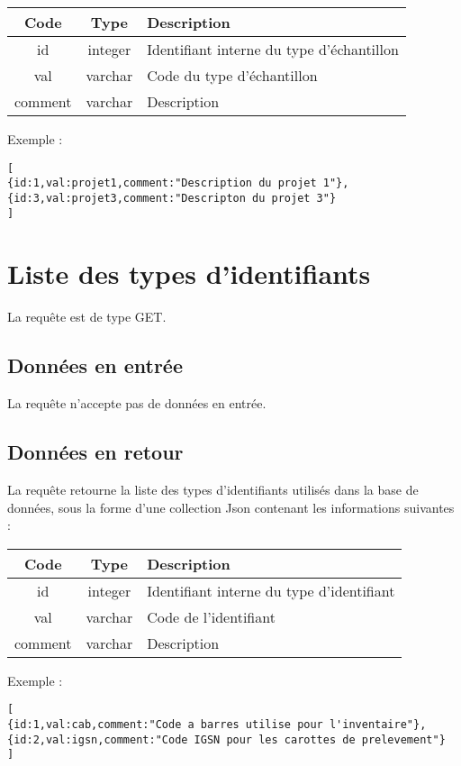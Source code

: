 \begin{longtable}{|c|c|>{\raggedright\arraybackslash}p{6cm}|}
\hline 
Code & Type & Description \\ 
\hline
id & integer & Identifiant interne du type d'échantillon\\
\hline
val & varchar & Code du type d'échantillon\\
\hline
comment & varchar & Description\\
\hline \endhead
\end{longtable}

Exemple :
\begin{lstlisting}
[
{id:1,val:projet1,comment:"Description du projet 1"},
{id:3,val:projet3,comment:"Descripton du projet 3"}
]
\end{lstlisting}

\section{Liste des types d'identifiants}
\label{idtype}

La requête est de type GET.
\subsection{Données en entrée}
La requête n'accepte pas de données en entrée.

\subsection{Données en retour}
La requête retourne la liste des types d'identifiants utilisés dans la base de données, sous la forme d'une collection Json contenant les informations suivantes :

\begin{longtable}{|c|c|>{\raggedright\arraybackslash}p{6cm}|}
\hline 
Code & Type & Description \\ 
\hline
id & integer & Identifiant interne du type d'identifiant\\
\hline
val & varchar & Code de l'identifiant\\
\hline
comment & varchar & Description\\
\hline \endhead
\end{longtable}

Exemple :
\begin{lstlisting}
[
{id:1,val:cab,comment:"Code a barres utilise pour l'inventaire"},
{id:2,val:igsn,comment:"Code IGSN pour les carottes de prelevement"}
]
\end{lstlisting}

